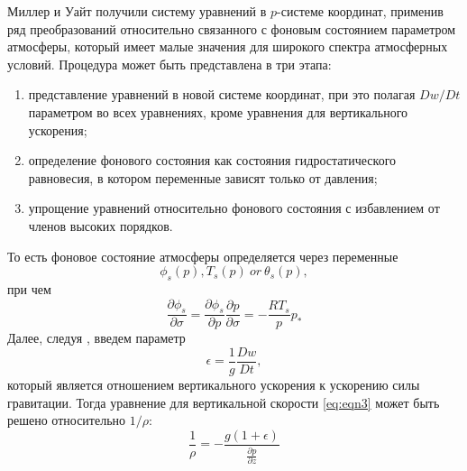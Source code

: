 Миллер и Уайт \citep{MillerWhite1986} получили систему уравнений в $p$-системе координат, применив ряд преобразований относительно связанного с фоновым состоянием параметром атмосферы, который имеет малые значения для широкого спектра атмосферных условий. Процедура может быть представлена в три этапа: \\
\begin{enumerate}
\item представление уравнений в новой системе координат, при это полагая $Dw/Dt$ параметром во всех уравнениях, кроме уравнения для вертикального ускорения;
\item определение фонового состояния как состояния гидростатического равновесия, в котором переменные зависят только от давления;
\item упрощение уравнений относительно фонового состояния с избавлением от членов высоких порядков.
\end{enumerate}

То есть фоновое состояние атмосферы определяется через переменные $$\phi_s(p), T_s(p)~or~\theta_s(p),$$
при чем
\begin{equation}
\frac{\partial\phi_s}{\partial\sigma}=\frac{\partial\phi_s}{\partial p}\frac{\partial p}{\partial\sigma}=-\frac{RT_s}{p}p_*
\end{equation}
Далее, следуя \citep{MillerWhite1986}, введем параметр
\begin{equation}
\epsilon=\frac{1}{g}\frac{Dw}{Dt},
\end{equation}
который является отношением вертикального ускорения к ускорению силы гравитации. Тогда уравнение для вертикальной скорости \eqref{eq:eqn3} может быть решено относительно $1/\rho$:
\begin{equation}
\frac{1}{\rho}=-\frac{g(1+\epsilon)}{\frac{\partial p}{\partial z}} \label{eq:vol}
\end{equation}

